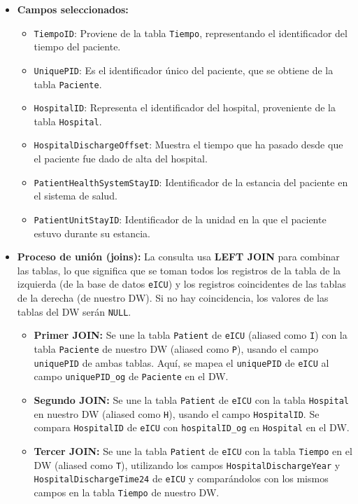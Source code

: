 \documentclass[12pt, a4paper, twoside]{article}
\begin{document}
	\begin{itemize} \item \textbf{Campos seleccionados:} 
		\begin{itemize} 
			\item \texttt{TiempoID}: Proviene de la tabla \texttt{Tiempo}, representando el identificador del tiempo del paciente. \item \texttt{UniquePID}: Es el identificador único del paciente, que se obtiene de la tabla \texttt{Paciente}. \item \texttt{HospitalID}: Representa el identificador del hospital, proveniente de la tabla \texttt{Hospital}. \item \texttt{HospitalDischargeOffset}: Muestra el tiempo que ha pasado desde que el paciente fue dado de alta del hospital. \item \texttt{PatientHealthSystemStayID}: Identificador de la estancia del paciente en el sistema de salud. \item \texttt{PatientUnitStayID}: Identificador de la unidad en la que el paciente estuvo durante su estancia. 
		\end{itemize}
		
		\item \textbf{Proceso de unión (joins):}
		La consulta usa \textbf{LEFT JOIN} para combinar las tablas, lo que significa que se toman todos los registros de la tabla de la izquierda (de la base de datos \texttt{eICU}) y los registros coincidentes de las tablas de la derecha (de nuestro DW). Si no hay coincidencia, los valores de las tablas del DW serán \texttt{NULL}.
		
		\begin{itemize}
			\item \textbf{Primer JOIN:} Se une la tabla \texttt{Patient} de \texttt{eICU} (aliased como \texttt{I}) con la tabla \texttt{Paciente} de nuestro DW (aliased como \texttt{P}), usando el campo \texttt{uniquePID} de ambas tablas. Aquí, se mapea el \texttt{uniquePID} de \texttt{eICU} al campo \texttt{uniquePID\_og} de \texttt{Paciente} en el DW.
			
			\item \textbf{Segundo JOIN:} Se une la tabla \texttt{Patient} de \texttt{eICU} con la tabla \texttt{Hospital} en nuestro DW (aliased como \texttt{H}), usando el campo \texttt{HospitalID}. Se compara \texttt{HospitalID} de \texttt{eICU} con \texttt{hospitalID\_og} en \texttt{Hospital} en el DW.
			
			\item \textbf{Tercer JOIN:} Se une la tabla \texttt{Patient} de \texttt{eICU} con la tabla \texttt{Tiempo} en el DW (aliased como \texttt{T}), utilizando los campos \texttt{HospitalDischargeYear} y \texttt{HospitalDischargeTime24} de \texttt{eICU} y comparándolos con los mismos campos en la tabla \texttt{Tiempo} de nuestro DW.
		\end{itemize}
		

\end{itemize}
\end{document}
